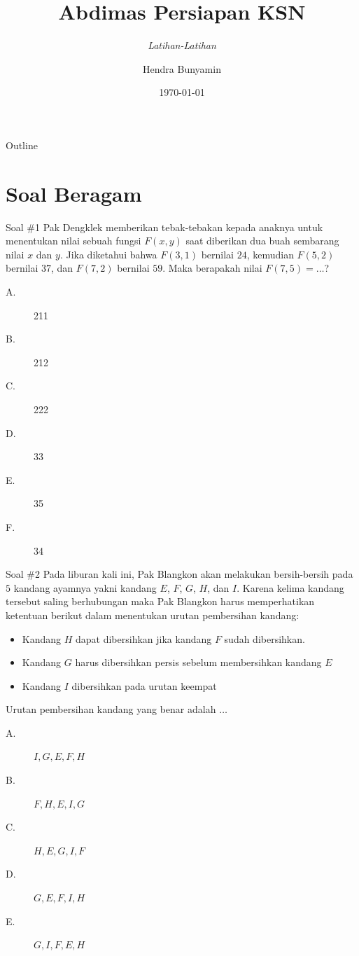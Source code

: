 \documentclass[english,t]{beamer}
\title[]
{\textbf{Abdimas Persiapan KSN}}
\subtitle
{\textit{Latihan-Latihan}\\ \citep{ppn2020soalksnk}}
\author{Hendra Bunyamin}
\date[NUNI IT Online] %
{\today}
\begin{document}
 
	
	\begin{frame}
		\titlepage
	\end{frame}
	
	\begin{frame}{Outline}
		\tableofcontents
	\end{frame}
	
	\section{Soal Beragam} 
	\begin{frame}{Soal \#1} 
		Pak Dengklek memberikan tebak-tebakan kepada anaknya untuk menentukan nilai sebuah fungsi $F(x, y)$ saat diberikan dua buah sembarang nilai $x$ dan $y$. Jika diketahui bahwa $F(3, 1)$ bernilai $24$, kemudian $F(5,2)$ bernilai $37$, dan $F(7, 2)$ bernilai $59$. Maka berapakah nilai $F(7, 5) = \ldots$? 
		\begin{description}
		\item[A.] 211
		\item[B.] 212
		\item[C.] 222
		\item[D.] 33
		\item[E.] 35
		\item[F.] 34
		\end{description}
	\end{frame}

	
	\begin{frame}{Soal \#2} 
		Pada liburan kali ini, Pak Blangkon akan melakukan bersih-bersih pada $5$ kandang ayamnya yakni kandang $E$, $F$, $G$, $H$, dan $I$. Karena kelima kandang tersebut saling berhubungan maka Pak Blangkon harus memperhatikan ketentuan berikut dalam menentukan urutan pembersihan kandang:
		\begin{itemize}
			\item Kandang $H$ dapat dibersihkan jika kandang $F$ sudah dibersihkan.
			\item Kandang $G$ harus dibersihkan persis sebelum membersihkan kandang $E$
			\item Kandang $I$ dibersihkan pada urutan keempat
		\end{itemize}		
		Urutan pembersihan kandang yang benar adalah $\ldots$
		\begin{description}
			\item[A.] $I, G, E, F, H$
			\item[B.] $F, H, E, I, G$
			\item[C.] $H, E, G, I, F$
			\item[D.] $G, E, F, I, H$
			\item[E.] $G, I, F, E, H$
		\end{description}
	\end{frame}
\end{document}
